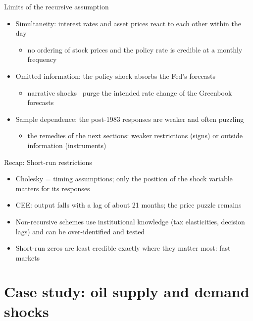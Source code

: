 \begin{frame}{Limits of the recursive assumption}
\itemsize{\small}
\begin{itemize}
    \item Simultaneity: interest rates and asset prices react to each other within the day
    \begin{itemize}
        \item no ordering of stock prices and the policy rate is credible at a monthly frequency
    \end{itemize}
    \item Omitted information: the policy shock absorbs the Fed's forecasts
    \begin{itemize}
        \item narrative shocks \ purge the intended rate change of the Greenbook forecasts
    \end{itemize}
    \item Sample dependence: the post-1983 responses are weaker and often puzzling 
    \begin{itemize}
        \item the remedies of the next sections: weaker restrictions (signs) or outside information (instruments)
    \end{itemize}
\end{itemize}
\end{frame}

\begin{frame}{Recap: Short-run restrictions}
\itemsize{\small}
\begin{itemize}
    \item Cholesky = timing assumptions; only the position of the shock variable matters for its responses
    \item CEE: output falls with a lag of about 21 months; the price puzzle remains
    \item Non-recursive schemes use institutional knowledge (tax elasticities, decision lags) and can be over-identified and tested
    \item Short-run zeros are least credible exactly where they matter most: fast markets
\end{itemize}
\end{frame}


\section{Case study: oil supply and demand shocks}

